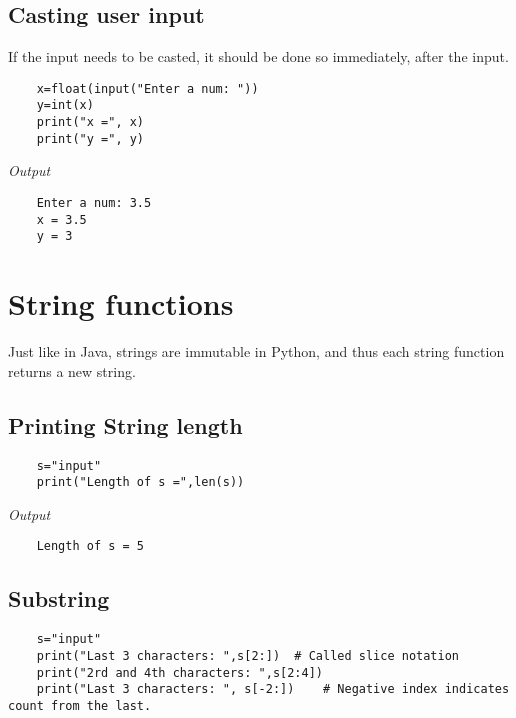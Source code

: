 \documentclass{report}
\begin{document}
	\subsection{Casting user input}
	If the input needs to be casted, it should be done so immediately, after the input.
	
	\vspace{-15pt}
	\begin{verbatim}
	x=float(input("Enter a num: "))
	y=int(x)
	print("x =", x)
	print("y =", y)
	\end{verbatim}
	\vspace{-10pt}
	
	\textit{Output}
	\vspace{-15pt}
	\begin{verbatim}
	Enter a num: 3.5
	x = 3.5
	y = 3
	\end{verbatim}
	\vspace{-10pt}
	
	\section{String functions}
	Just like in Java, strings are immutable in Python, and thus each string function returns a new string. 
	\subsection{Printing String length}
	\vspace{-15pt}
	\begin{verbatim}
	s="input"
	print("Length of s =",len(s))
	\end{verbatim}
	\vspace{-10pt}
	
	\textit{Output}
	\vspace{-15pt}
	\begin{verbatim}
	Length of s = 5
	\end{verbatim}
	\vspace{-10pt}
	
	\subsection{Substring}
	\vspace{-15pt}
	\begin{verbatim}
	s="input"
	print("Last 3 characters: ",s[2:])	# Called slice notation
	print("2rd and 4th characters: ",s[2:4])
	print("Last 3 characters: ", s[-2:])	# Negative index indicates count from the last.
	\end{verbatim}
	\vspace{-10pt}
	
\end{document}
